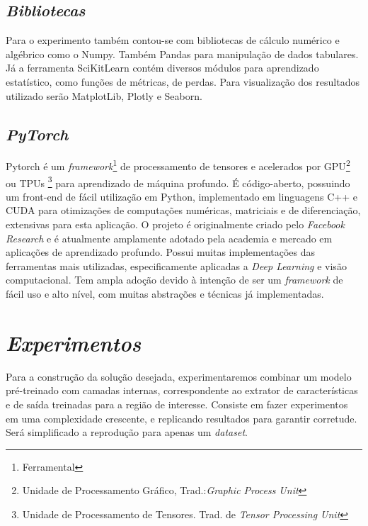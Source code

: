 \subsection{\textit{Bibliotecas}}\label{sec:Cap2_NumpyPandas}

Para o experimento também contou-se com bibliotecas de cálculo numérico e algébrico como o Numpy. Também Pandas para manipulação de dados tabulares. Já a ferramenta SciKitLearn contém diversos módulos para aprendizado estatístico, como funções de métricas, de perdas. Para visualização dos resultados utilizado serão MatplotLib, Plotly e Seaborn.

\subsection{\textit{PyTorch}}\label{sec:Cap2_PyTorch}
Pytorch é um \textit{framework}\footnote{Ferramental} de processamento de tensores e acelerados por GPU\footnote[3]{Unidade de Processamento Gráfico, Trad.:\textit{Graphic Process Unit}} ou TPUs \footnote{Unidade de Processamento de Tensores. Trad. de \textit{Tensor Processing Unit}} para aprendizado de máquina profundo. É código-aberto, possuindo um front-end de fácil utilização em Python, implementado em linguagens C++ e CUDA para otimizações de computações numéricas, matriciais e de diferenciação, extensivas para esta aplicação.
O projeto é originalmente criado pelo \textit{Facebook Research} e é atualmente amplamente adotado pela academia e mercado em aplicações de aprendizado profundo. Possui muitas implementações das ferramentas mais utilizadas, especificamente aplicadas a \textit{Deep Learning} e visão computacional. Tem ampla adoção devido à intenção de ser um \textit{framework} de fácil uso e alto nível, com muitas abstrações e técnicas já implementadas.



\section{\textit{Experimentos}}\label{sec:Cap3_Experimentos}

Para a construção da solução desejada, experimentaremos combinar um modelo pré-treinado com camadas internas, correspondente ao extrator de características e de saída treinadas para a região de interesse.
Consiste em fazer experimentos em uma complexidade crescente, e replicando resultados para garantir corretude. Será simplificado a reprodução para apenas um \textit{dataset}.


